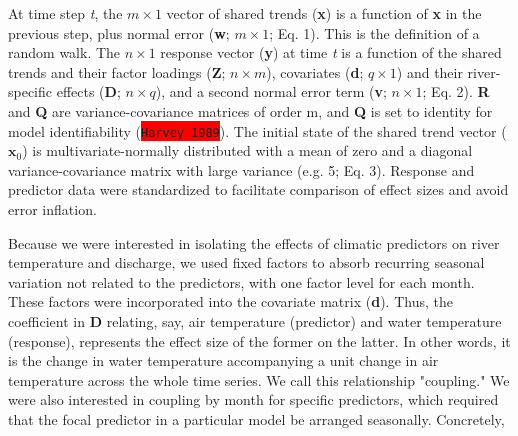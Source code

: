 \documentclass[notitlepage]{article}
\begin{document}
At time step {\it t}, the $m \times 1$ vector of shared trends (\textbf{x}) is a function of \textbf{x} in the previous step, plus normal error (\textbf{w}; $m\times 1$; Eq. 1). This is the definition of a random walk. The $n\times 1$ response vector (\textbf{y}) at time {\it t} is a function of the shared trends and their factor loadings (\textbf{Z}; $n\times m$), covariates (\textbf{d}; $q\times 1$) and their river-specific effects (\textbf{D}; $n\times q$), and a second normal error term (\textbf{v}; $n\times 1$; Eq. 2). \textbf{R} and \textbf{Q} are variance-covariance matrices of order m, and \textbf{Q} is set to identity for model identifiability (\colorbox{red}{\lstinline{Harvey 1989}}). The initial state of the shared trend vector ($\bm{x}_0$) is multivariate-normally distributed with a mean of zero and a diagonal variance-covariance matrix with large variance (e.g. 5; Eq. 3). Response and predictor data were standardized to facilitate comparison of effect sizes and avoid error inflation.


Because we were interested in isolating the effects of climatic predictors on river temperature and discharge, we used fixed factors to absorb recurring seasonal variation not related to the predictors, with one factor level for each month. These factors were incorporated into the covariate matrix (\textbf{d}). Thus, the coefficient in \textbf{D} relating, say, air temperature (predictor) and water temperature (response), represents the effect size of the former on the latter. In other words, it is the change in water temperature accompanying a unit change in air temperature across the whole time series. We call this relationship "coupling." We were also interested in coupling by month for specific predictors, which required that the focal predictor in a particular model be arranged seasonally. Concretely,
\end{document}
